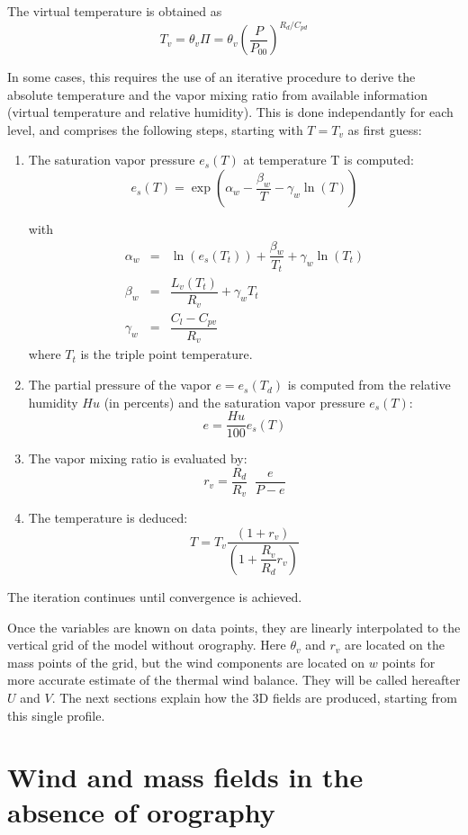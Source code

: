 The virtual temperature is obtained as
\begin{equation}
T_{v} = \theta_{v} \Pi = \theta_{v} \left( \dfrac{P}{P_{00}} \right) ^{R_{d}/C_{pd}}
\end{equation}



In some cases, this requires the use of an iterative procedure
to derive the absolute temperature and the vapor mixing ratio from
available information (virtual temperature and relative humidity).
This is done independantly for each level, and
comprises the following steps, starting with $T=T_v$ as first guess:
\begin{enumerate}
\item The saturation vapor pressure $e_{s}(T)$ at temperature T is computed:
$$
e_{s}(T) =  \exp\left( \alpha_{w} - \dfrac{\beta_{w}}{T} - \gamma_{w}
\ln (T)\right)
$$

with
\begin{eqnarray*}
\alpha_{w} & = &  \ln (e_{s}(T_{t}) ) + \dfrac{\beta_{w}}{T_{t}} + \gamma_{w}
\ln (T_{t}) \\
\beta_{w} & = & \dfrac{L_{v}(T_{t})}{R_{v}} + \gamma_{w} T_{t} \\
\gamma_{w} & = & \dfrac{C_{l}-C_{pv}}{R_{v}}
\end{eqnarray*}
where $T_t$ is the triple point temperature.

\item  The partial pressure of the vapor $e= e_{s}(T_d)$
is computed from the relative humidity $Hu$ (in percents) and the saturation
vapor pressure $e_{s}(T)$:
$$
e= \dfrac{Hu}{100} e_{s}(T)
$$
\item  The vapor mixing ratio is evaluated by:
$$
r_{v} = \dfrac{R_{d}}{R_{v}} \;\; \dfrac{e}{P-e}
$$
\item   The temperature is deduced:
$$
T = T_{v} \dfrac{(1+r_{v})}{(1 + \dfrac{R_{v}}{R_{d}}r_{v})}
$$
\end{enumerate}
The iteration continues until convergence is achieved.

Once the variables are known on data points, they are linearly
interpolated to the vertical grid of the model without orography.
Here $\theta_v$ and $r_v$ are located on the mass points of the grid,
but the wind components are located on $w$ points for more accurate
estimate of the thermal wind balance. They will be called hereafter
$U$ and $V$.  The
next sections explain how the 3D fields are produced, starting from this
single profile.

\section{Wind and mass fields in the absence of orography}

